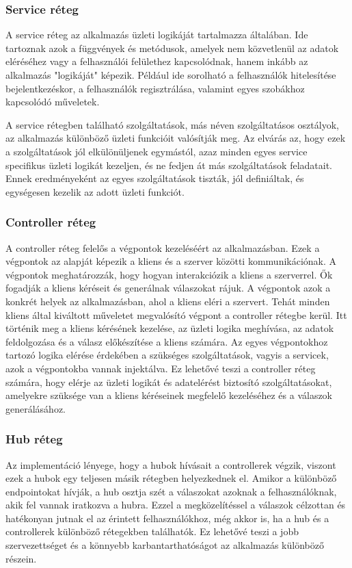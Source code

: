 \subsubsection{Service réteg}
A service réteg az alkalmazás üzleti logikáját tartalmazza általában. Ide tartoznak azok a függvények és metódusok, amelyek nem közvetlenül az adatok eléréséhez vagy a felhasználói felülethez kapcsolódnak, hanem inkább az alkalmazás "logikáját" képezik. Például ide sorolható a felhasználók hitelesítése bejelentkezéskor, a felhasználók regisztrálása, valamint egyes szobákhoz kapcsolódó műveletek.

A service rétegben található szolgáltatások, más néven szolgáltatásos osztályok, az alkalmazás különböző üzleti funkcióit valósítják meg. Az elvárás az, hogy ezek a szolgáltatások jól elkülönüljenek egymástól, azaz minden egyes service specifikus üzleti logikát kezeljen, és ne fedjen át más szolgáltatások feladatait. Ennek eredményeként az egyes szolgáltatások tiszták, jól definiáltak, és egységesen kezelik az adott üzleti funkciót.

\subsubsection{Controller réteg}
A controller réteg felelős a végpontok kezeléséért az alkalmazásban. Ezek a végpontok az alapját képezik a kliens és a szerver közötti kommunikációnak. A végpontok meghatározzák, hogy hogyan interakciózik a kliens a szerverrel. Ők fogadják a kliens kéréseit és generálnak válaszokat rájuk.
A végpontok azok a konkrét helyek az alkalmazásban, ahol a kliens eléri a szervert. Tehát minden kliens által kiváltott műveletet megvalósító végpont a controller rétegbe kerül. Itt történik meg a kliens kérésének kezelése, az üzleti logika meghívása, az adatok feldolgozása és a válasz előkészítése a kliens számára.
Az egyes végpontokhoz tartozó logika elérése érdekében a szükséges szolgáltatások, vagyis a servicek, azok a végpontokba vannak injektálva. Ez lehetővé teszi a controller réteg számára, hogy elérje az üzleti logikát és adatelérést biztosító szolgáltatásokat, amelyekre szüksége van a kliens kéréseinek megfelelő kezeléséhez és a válaszok generálásához.
\subsubsection{Hub réteg}
Az implementáció lényege, hogy a hubok hívásait a controllerek végzik, viszont ezek a hubok egy teljesen másik rétegben helyezkednek el. Amikor a különböző endpointokat hívják, a hub osztja szét a válaszokat azoknak a felhasználóknak, akik fel vannak iratkozva a hubra. Ezzel a megközelítéssel a válaszok célzottan és hatékonyan jutnak el az érintett felhasználókhoz, még akkor is, ha a hub és a controllerek különböző rétegekben találhatók. Ez lehetővé teszi a jobb szervezettséget és a könnyebb karbantarthatóságot az alkalmazás különböző részein.

